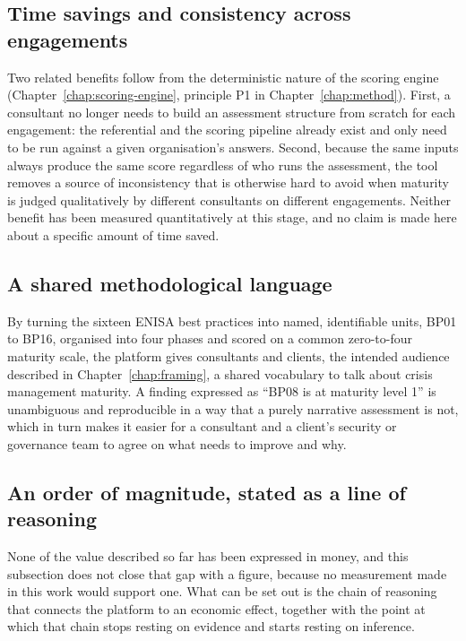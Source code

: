 \subsection{Time savings and consistency across engagements}
\label{sec:impact-consulting-time-savings}

Two related benefits follow from the deterministic nature of the scoring engine (Chapter~\ref{chap:scoring-engine}, principle P1 in Chapter~\ref{chap:method}). First, a consultant no longer needs to build an assessment structure from scratch for each engagement: the referential and the scoring pipeline already exist and only need to be run against a given organisation's answers. Second, because the same inputs always produce the same score regardless of who runs the assessment, the tool removes a source of inconsistency that is otherwise hard to avoid when maturity is judged qualitatively by different consultants on different engagements. Neither benefit has been measured quantitatively at this stage, and no claim is made here about a specific amount of time saved.

\subsection{A shared methodological language}
\label{sec:impact-consulting-shared-language}

By turning the sixteen ENISA best practices into named, identifiable units, BP01 to BP16, organised into four phases and scored on a common zero-to-four maturity scale, the platform gives consultants and clients, the intended audience described in Chapter~\ref{chap:framing}, a shared vocabulary to talk about crisis management maturity. A finding expressed as ``BP08 is at maturity level 1'' is unambiguous and reproducible in a way that a purely narrative assessment is not, which in turn makes it easier for a consultant and a client's security or governance team to agree on what needs to improve and why.

\subsection{An order of magnitude, stated as a line of reasoning}
\label{sec:impact-consulting-economics}

None of the value described so far has been expressed in money, and this subsection does not close that gap with a figure, because no measurement made in this work would support one. What can be set out is the chain of reasoning that connects the platform to an economic effect, together with the point at which that chain stops resting on evidence and starts resting on inference.

